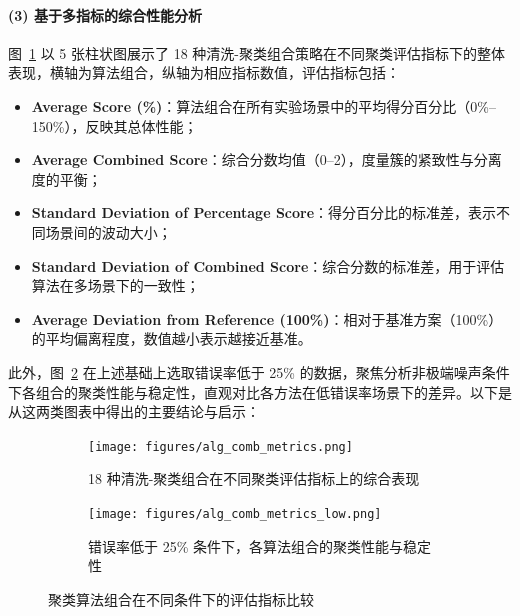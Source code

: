 \documentclass[10pt]{article} %
\numberwithin{equation}{section}
\begin{document}
\paragraph{(3) 基于多指标的综合性能分析}
图~\ref{fig:alg_comb_metrics} 以 5 张柱状图展示了 18 种清洗-聚类组合策略在不同聚类评估指标下的整体表现，横轴为算法组合，纵轴为相应指标数值，评估指标包括：
\begin{itemize}
    \item \textbf{Average Score (\%)}：算法组合在所有实验场景中的平均得分百分比（0\%--150\%），反映其总体性能；
    \item \textbf{Average Combined Score}：综合分数均值（0--2），度量簇的紧致性与分离度的平衡；
    \item \textbf{Standard Deviation of Percentage Score}：得分百分比的标准差，表示不同场景间的波动大小；
    \item \textbf{Standard Deviation of Combined Score}：综合分数的标准差，用于评估算法在多场景下的一致性；
    \item \textbf{Average Deviation from Reference (100\%)}：相对于基准方案（100\%）的平均偏离程度，数值越小表示越接近基准。
\end{itemize}

此外，图~\ref{fig:alg_comb_metrics_low} 在上述基础上选取错误率低于 25\% 的数据，聚焦分析非极端噪声条件下各组合的聚类性能与稳定性，直观对比各方法在低错误率场景下的差异。以下是从这两类图表中得出的主要结论与启示：

\begin{figure}[htbp]
    \centering
    \setlength{\abovecaptionskip}{5pt}  %
    \setlength{\belowcaptionskip}{5pt}  %

    \begin{subfigure}{1.0\linewidth}  %
        \centering
        \texttt{[image: figures/alg\_comb\_metrics.png]}
        \caption{18 种清洗-聚类组合在不同聚类评估指标上的综合表现}
        \label{fig:alg_comb_metrics}
    \end{subfigure}

    \vspace{1em}  %

    \begin{subfigure}{1.0\linewidth}  %
        \centering
        \texttt{[image: figures/alg\_comb\_metrics\_low.png]}
        \caption{错误率低于 25\% 条件下，各算法组合的聚类性能与稳定性}
        \label{fig:alg_comb_metrics_low}
    \end{subfigure}

    \caption{聚类算法组合在不同条件下的评估指标比较}
    \label{fig:alg_comb_metrics_comparison}
\end{figure}
\vspace{-10pt}
\end{document}
